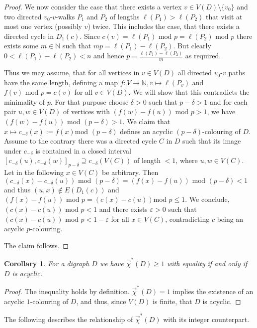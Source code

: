 \documentclass[fontsize=11pt,a4paper,DIV12]{scrartcl}
\theoremstyle{meiner}
\newtheorem{corollary}{Corollary}
\theoremstyle{definition}
\begin{document}
\begin{proof}
  We now consider the case that there exists a vertex $v \in V(D)
  \setminus \{v_0\}$ and two directed $v_0$-$v$-walks $P_1$ and $P_2$
  of lengths $\ell(P_1)> \ell(P_2)$ that visit at most one vertex
  (possibly $v$) twice. This includes the case, that there exists a
  directed cycle in $D_1(c)$. Since $c(v)=\ell(P_1) \text{ mod
  }p=\ell(P_2) \text{ mod }p$ there exists some $m\in \mathbb{N}$ such
  that $mp=\ell(P_1)-\ell(P_2)$. But clearly $0<\ell(P_1)-\ell(P_2)<n$
  and hence $p=\frac{\ell(P_1)-\ell(P_2)}{m}$ as required.

  Thus we may assume, that for all vertices in $v \in V(D)$ all
  directed $v_0$-$v$ paths have the same length, defining a map $f:V
  \to \mathbb{N}, v \mapsto \ell(P_v)$ and $f(v) \text{ mod }p=c(v)$
  for all $v \in V(D)$. We will show that this contradicts the
  minimality of $p$.  For that purpose choose $\delta>0$ such that
  $p-\delta>1$ and for each pair $u,w \in V(D)$ of vertices with
  $(f(w)-f(u)) \text{ mod }p>1$, we have $(f(w)-f(u)) \text{ mod
  }(p-\delta)>1$. We claim that $x \mapsto c_{-\delta}(x):=f(x) \text{
    mod }(p-\delta)$ defines an acyclic $(p-\delta)$-colouring of $D$.
  Assume to the contrary there was a directed cycle $C$ in $D$ such
  that its image under $c_{-\delta}$ is contained in a closed interval
  $[c_{-\delta}(u),c_{-\delta}(w)]_{p-\delta} \supseteq
  c_{-\delta}(V(C))$ of length $<1$, where $u,w \in V(C)$. Let in the
  following $x \in V(C)$ be arbitrary. Then
  $(c_{-\delta}(x)-c_{-\delta}(u)) \text{ mod }(p-\delta)=(f(x)-f(u))
  \text{ mod }(p-\delta)<1$ and thus $(u,x) \notin
  E(D_1(c))$ and  $(f(x)-f(u)) \text{ mod }p =(c(x)-c(u)) \text
  {mod }p \leq 1$. We conclude, $(c(x)-c(u)) \text{ mod }p<1$ and there exists
  $\varepsilon >0 $ such that $(c(x)-c(u)) \text{ mod
  }p<1-\varepsilon$ for all $x \in V(C)$, contradicting
  $c$ being an acyclic
  $p$-colouring. 

 The claim follows.
\end{proof}
\begin{corollary}
  For a digraph $D$ we have $\vec{\chi}^\ast(D) \ge 1$ with equality
  if and only if $D$ is acyclic.
\end{corollary}
\begin{proof}
  The inequality holds by definition.  $\vec{\chi}^\ast(D) = 1$
  implies the existence of an acyclic $1$-colouring of $D$, and thus,
  since $V(D)$ is finite, that $D$ is acyclic.
\end{proof}
The following describes the relationship of $\vec{\chi}^\ast(D)$ with its integer counterpart.
\end{document}
